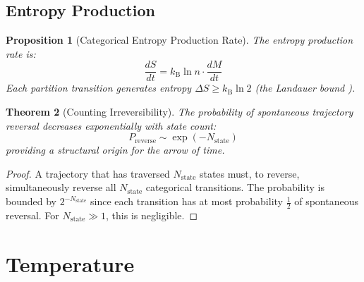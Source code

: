 \documentclass[twocolumn,10pt,a4paper]{article}
\theoremstyle{plain}
\newtheorem{theorem}{Theorem}[section]
\newtheorem{proposition}[theorem]{Proposition}
\theoremstyle{definition}
\theoremstyle{remark}
\newcommand{\kB}{k_{\mathrm{B}}}
\begin{document}
\subsection{Entropy Production}

\begin{proposition}[Categorical Entropy Production Rate]
\label{prop:entropy_rate}
The entropy production rate is:
\begin{equation}
    \frac{dS}{dt} = \kB \ln n \cdot \frac{dM}{dt}
\end{equation}
Each partition transition generates entropy $\Delta S \geq \kB \ln 2$ (the Landauer bound \cite{landauer1961}).
\end{proposition}

\begin{theorem}[Counting Irreversibility]
\label{thm:irreversibility}
The probability of spontaneous trajectory reversal decreases exponentially with state count:
\begin{equation}
    P_{\mathrm{reverse}} \sim \exp(-N_{\mathrm{state}})
\end{equation}
providing a structural origin for the arrow of time.
\end{theorem}

\begin{proof}
A trajectory that has traversed $N_{\mathrm{state}}$ states must, to reverse, simultaneously reverse all $N_{\mathrm{state}}$ categorical transitions. The probability is bounded by $2^{-N_{\mathrm{state}}}$ since each transition has at most probability $\tfrac{1}{2}$ of spontaneous reversal. For $N_{\mathrm{state}} \gg 1$, this is negligible.
\end{proof}

\section{Temperature}
\label{sec:temperature}
\end{document}
